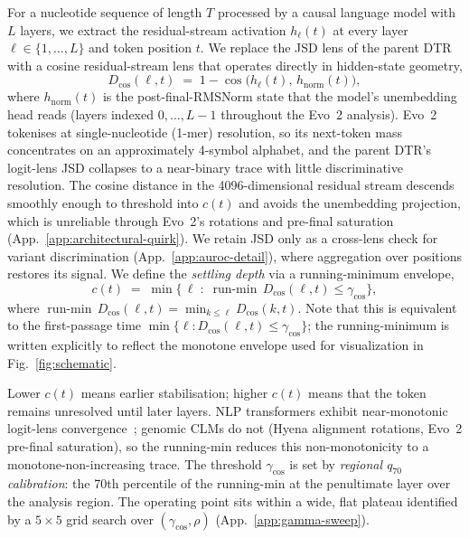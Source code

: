 \documentclass{article}
\theoremstyle{plain}
\theoremstyle{definition}
\theoremstyle{remark}
\newcommand{\hl}{h_{\ell}}
\newcommand{\hnorm}{h_{\mathrm{norm}}}
\newcommand{\Dcos}{D_{\cos}}
\newcommand{\runmin}{\operatorname{run\text{-}min}}
\begin{document}
For a nucleotide sequence of length $T$ processed by a causal language model with $L$ layers, we extract the residual-stream activation $\hl(t)$ at every layer $\ell\!\in\!\{1,\ldots,L\}$ and token position $t$. We replace the JSD lens of the parent DTR~\cite{chen2026deepthinking} with a cosine residual-stream lens that operates directly in hidden-state geometry,
\begin{equation}
  \Dcos(\ell, t) \;=\; 1 - \cos\!\bigl(\hl(t),\, \hnorm(t)\bigr),
  \label{eq:cos-lens}
\end{equation}
where $\hnorm(t)$ is the post-final-RMSNorm state that the model's unembedding head reads (layers indexed $0,\ldots,L\!-\!1$ throughout the Evo~2 analysis).
Evo~2 tokenises at single-nucleotide (1-mer) resolution, so its next-token mass concentrates on an approximately 4-symbol alphabet, and the parent DTR's logit-lens JSD collapses to a near-binary trace with little discriminative resolution. The cosine distance in the 4096-dimensional residual stream descends smoothly enough to threshold into $c(t)$ and avoids the unembedding projection, which is unreliable through Evo~2's rotations and pre-final saturation (App.~\ref{app:architectural-quirk}). We retain JSD only as a cross-lens check for variant discrimination (App.~\ref{app:auroc-detail}), where aggregation over positions restores its signal. We define the \emph{settling depth} via a running-minimum envelope,
\begin{equation}
  c(t) \;=\; \min\bigl\{\, \ell \;:\; \runmin\,\Dcos(\ell, t) \le \gamma_{\cos}\bigr\},
  \label{eq:settling}
\end{equation}
where $\runmin\,\Dcos(\ell,t) = \min_{k\le\ell}\Dcos(k,t)$. Note that this is equivalent to the first-passage time $\min\{\ell : D_{\cos}(\ell, t) \leq \gamma_{\cos}\}$; the running-minimum is written explicitly to reflect the monotone envelope used for visualization in Fig.~\ref{fig:schematic}.

Lower $c(t)$ means earlier stabilisation; higher $c(t)$ means that the token remains unresolved until later layers. NLP transformers exhibit near-monotonic logit-lens convergence~\cite{nostalgebraist2020logitlens,belrose2023tunedlens,pal2023futurelens}; genomic CLMs do not (Hyena alignment rotations, Evo~2 pre-final saturation), so the running-min reduces this non-monotonicity to a monotone-non-increasing trace. The threshold $\gamma_{\cos}$ is set by \emph{regional $q_{70}$ calibration}: the 70th percentile of the running-min at the penultimate layer over the analysis region. The operating point sits within a wide, flat plateau identified by a $5\!\times\!5$ grid search over $(\gamma_{\cos}, \rho)$ (App.~\ref{app:gamma-sweep}).
\end{document}

